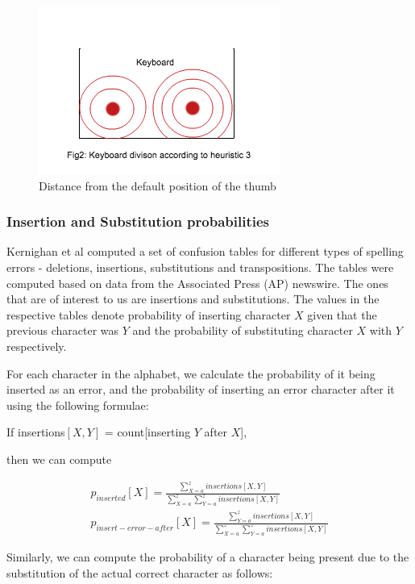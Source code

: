 \documentclass[letterpaper, 10 pt, conference]{ieeeconf}  %
\begin{document}
\begin{figure}[!h]
    \centering
    \includegraphics[scale=0.8]{heuristic3.png}
    \caption{Distance from the default position of the thumb}
    \label{fig:divfeature3}
\end{figure}

\subsubsection{Insertion and Substitution probabilities}
Kernighan et al\cite{kernighan1990spelling} computed a set of confusion tables for different types of spelling errors - deletions, insertions, substitutions and transpositions. The tables were computed based on data from the Associated Press (AP) newswire. The ones that are of interest to us are insertions and substitutions. The values in the respective tables denote probability of inserting character $X$ given that the previous character was $Y$ and the probability of substituting character $X$ with $Y$ respectively. 

For each character in the alphabet, we calculate the probability of it being inserted as an error, and the probability of inserting an error character after it using the following formulae:

If insertions$[X,Y]$ = count[inserting $Y$ after $X$],

then we can compute

\begin{align*}
p_{inserted}[X] = \frac{\sum\limits_{X=a}^{z} insertions[X,Y]}{\sum\limits_{X=a}^{z} \sum\limits_{Y=a}^{z}insertions[X,Y]}\\
p_{insert-error-after}[X] = \frac{\sum\limits_{Y=a}^{z} insertions[X,Y]}{\sum\limits_{X=a}^{z} \sum\limits_{Y=a}^{z}insertions[X,Y]}
\end{align*}

Similarly, we can compute the probability of a character being present due to the substitution of the actual correct character as follows:
\end{document}
